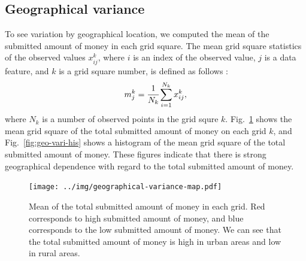 \documentclass[dvipdfmx, english]{ampmt}             %
\newcommand{\Figref}[1]{Fig.~\ref{#1}}
\begin{document}




\subsection*{Geographical variance}
To see variation by geographical location, we computed the mean of the submitted amount of money in each grid square. The mean grid square statistics of the observed values $x_{ij}^{k}$, where $i$ is an index of the observed value, $j$ is a data feature, and $k$ is a grid square number, is defined as follows : \begin{equation}\label{eq:grid-stat}
m_{j}^{k}= \cfrac{1}{N_k} \sum_{i=1}^{N_{k}}x_{ij}^{k},
\end{equation}
where $N_{k}$ is a number of observed points in the grid squre $k$.
\Figref{fig:geo-vari-map} shows the mean grid square of the total submitted amount of money on each grid $k$, and \Figref{fig:geo-vari-his} shows a histogram of the mean grid square of the total submitted amount of money. These figures indicate that there is strong geographical dependence with regard to the total submitted amount of money.

\begin{figure}[H]
\centerline{\texttt{[image: ../img/geographical-variance-map.pdf]}}
\caption{Mean of the total submitted amount of money in each grid. Red corresponds to high submitted amount of money, and blue corresponds to the low submitted amount of money. We can see that the total submitted amount of money is high in urban areas and low in rural areas.}
\label{fig:geo-vari-map}
\end{figure}
\end{document}
